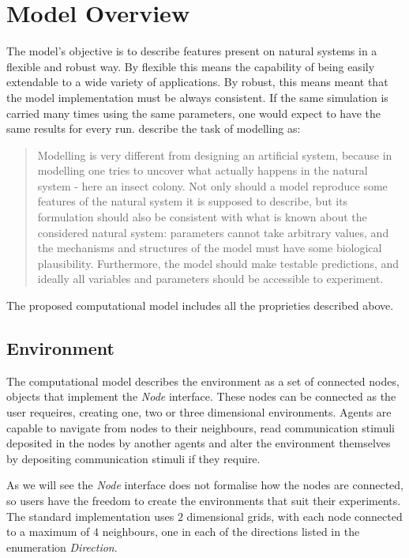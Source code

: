 
\chapter{Model Overview}
\label{ch:model-overview}

The model's objective is to describe features present on natural systems in a flexible and robust way. By flexible this means the capability of being easily extendable to a wide variety of applications. By robust, this means meant that the model implementation must be always consistent. If the same simulation is carried many times using the same parameters, one would expect to have the same results for every run. \citeauthor{bonabeau1999swarm} \cite{bonabeau1999swarm} describe the task of modelling as:

\begin{quote}
Modelling is very different from designing an artificial system, because in modelling one tries to uncover what actually happens in the natural system - here an insect colony. Not only should a model reproduce some features of the natural system it is supposed to describe, but its formulation should also be consistent with what is known about the considered natural system: parameters cannot take arbitrary values, and the mechanisms and structures of the model must have some biological plausibility. Furthermore, the model should make testable predictions, and ideally all variables and parameters should be accessible to experiment.
\end{quote}

The proposed computational model includes all the proprieties described above.

\section{Environment}

The computational model describes the environment as a set of connected nodes, objects that implement the \emph{Node} interface. These nodes can be connected as the user requeires, creating one, two or three dimensional environments. Agents are capable to navigate from nodes to their neighbours, read communication stimuli deposited in the nodes by another agents and alter the environment themselves by depositing communication stimuli if they require.

As we will see the \emph{Node} interface does not formalise how the nodes are connected, so users have the freedom to create the environments that suit their experiments. The standard implementation uses $2$ dimensional grids, with each node connected to a maximum of $4$ neighbours, one in each of the directions listed in the enumeration \emph{Direction}.

